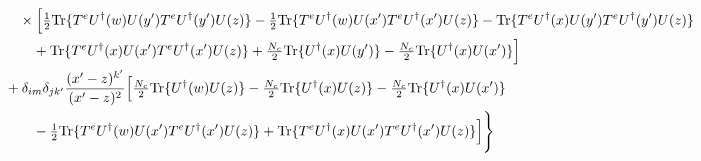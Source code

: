 \documentclass[10pt]{article}
\begin{document}
\begin{align}
&\qquad\qquad\times\Big[\tfrac12{\rm Tr}\{T^{e}U^{\dagger}(w)U(y')T^{e}U^{\dagger}(y')U(z)\}-\tfrac12{\rm Tr}\{T^{e}U^{\dagger}(w)U(x')T^{e}U^{\dagger}(x')U(z)\}-{\rm Tr}\{T^{e}U^{\dagger}(x)U(y')T^{e}U^{\dagger}(y')U(z)\}\notag\\
&\qquad\qquad\quad+{\rm Tr}\{T^{e}U^{\dagger}(x)U(x')T^{e}U^{\dagger}(x')U(z)\}+\tfrac{N_{c}}{2}{\rm Tr}\{U^{\dagger}(x)U(y')\}-\tfrac{N_{c}}{2}{\rm Tr}\{U^{\dagger}(x)U(x')\}\Big]\notag\\
&\qquad\quad+\delta_{im}\delta_{jk'}\frac{(x'-z)^{k'}}{(x'-z)^{2}}\Big[\tfrac{N_{c}}{2}{\rm Tr}\{U^{\dagger}(w)U(z)\}-\tfrac{N_{c}}{2}{\rm Tr}\{U^{\dagger}(x)U(z)\}-\tfrac{N_{c}}{2}{\rm Tr}\{U^{\dagger}(x)U(x')\}\notag\\
&\qquad\qquad\quad-\tfrac12{\rm Tr}\{T^{e}U^{\dagger}(w)U(x')T^{e}U^{\dagger}(x')U(z)\}+{\rm Tr}\{T^{e}U^{\dagger}(x)U(x')T^{e}U^{\dagger}(x')U(z)\}\Big]\Bigg\}
\end{align}
\end{document}
